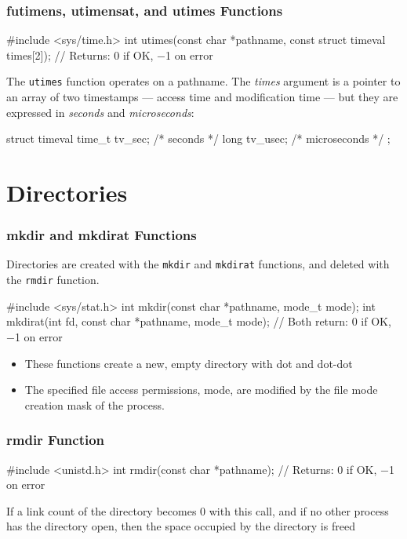\documentclass[newPxFont,sthlmFooter,nooffset]{beamer}
\begin{document}
\begin{frame}[containsverbatim,t]
    \frametitle{futimens, utimensat, and utimes Functions}

\begin{codedef}
#include <sys/time.h>
int utimes(const char *pathname, const struct timeval times[2]);
// Returns: 0 if OK, −1 on error
\end{codedef}

The \texttt{utimes} function operates on a pathname. The \textit{times} argument is a pointer to an array of two timestamps — access time and modification time — but they are expressed in \textit{seconds} and \textit{microseconds}:

\begin{codedef}
struct timeval {
       time_t tv_sec;    /* seconds */
       long   tv_usec;   /* microseconds */
};
\end{codedef}

\end{frame}



\section{Directories}

\begin{frame}[containsverbatim,t]
  \frametitle{mkdir and mkdirat Functions}
Directories are created with the \texttt{mkdir} and \texttt{mkdirat}
functions, and deleted with the \texttt{rmdir} function.

\begin{codedef}
#include <sys/stat.h>
int mkdir(const char *pathname, mode_t mode);
int mkdirat(int fd, const char *pathname, mode_t mode);
// Both return: 0 if OK, −1 on error
\end{codedef}

\begin{itemize}
\item These functions create a new, empty directory with dot and dot-dot
\item The specified file access permissions, mode, are modified by the file mode creation mask of the process.
\end{itemize}

\end{frame}


\begin{frame}[containsverbatim,t]
  \frametitle{rmdir Function}
\begin{codedef}
#include <unistd.h>
int rmdir(const char *pathname);
// Returns: 0 if OK, −1 on error
\end{codedef}
\bigskip

If a link count of the directory becomes 0 with this call, and if no other process has the directory open, then the space occupied by the directory is freed

\end{frame}
\end{document}
